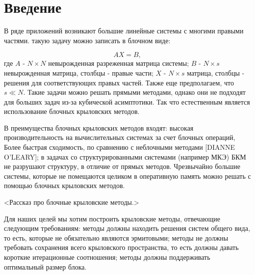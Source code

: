 \section{Введение}
\label{sec:Chapter0} 
В ряде приложений возникают большие линейные системы с многими правыми частями. такую задачу можно записать в блочном виде:\\
\begin{figure}
    \centering
    \label{fig:system}
\end{figure}

$$AX=B,$$
где $A$ - $N\times N$ невырожденная разреженная матрица системы;
$B$ - $N\times s$ невырожденная матрица, столбцы - правые части; 
$X$ - $N\times s$ матрица, столбцы - решения для соответствующих правых частей. 
Также еще предполагаем, что $s\ll N$.
Такие задачи можно решать прямыми методами, однако они не подходят для больших 
задач из-за кубической асимптотики. Так что естественным является использование 
блочных крыловских методов.\\

\par В преимущества блочных крыловских методов входят:
высокая производительность на вычислительных системах за счет блочных операций,
Более быстрая сходимость, по сравнению с неблочными методами [DIANNE O'LEARY]; 
в задачах со структурированными системами (например МКЭ) БКМ не разрушают структуру,
в отличие от прямых методов.
Чрезвычайно большие системы, которые не помещаются целиком в оперативную память 
можно решать с помощью блочных крыловских методов.\\
\par <Рассказ про блочные крыловские методы.>\\
\par Для наших целей мы хотим построить крыловские методы, отвечающие следующим требованиям: методы должны находить
решения систем общего вида, то есть, которые не обязательно являются эрмитовыми;
методы не должны требовать сохранения всего крыловского пространства, то есть должны 
давать короткие итерационные соотношения; 
методы должны поддерживать оптимальный размер блока.


\newpage
